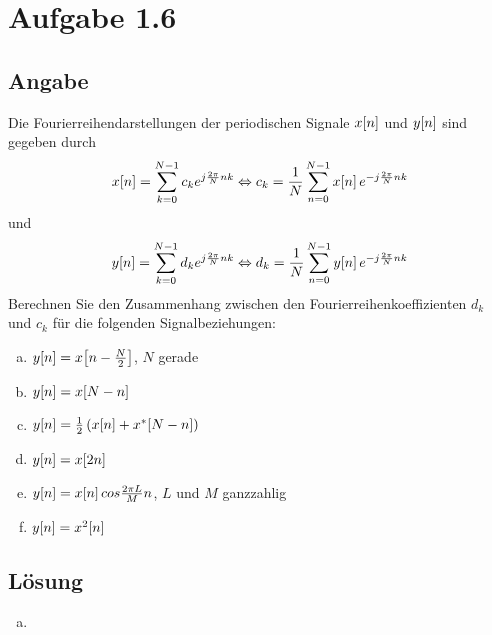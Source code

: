 \section*{Aufgabe 1.6}
\subsection*{Angabe}
Die Fourierreihendarstellungen der periodischen Signale $x\negthinspace\left[n\right]$ und $y\negthinspace\left[n\right]$ sind gegeben durch
\[
	x\negthinspace\left[n\right]=\sum_{k=0}^{N-1}c_ke^{j\frac{2\pi}{N}nk}\Leftrightarrow c_k=\frac{1}{N}\sum_{n=0}^{N-1}x\negthinspace\left[n\right]e^{-j\frac{2\pi}{N}nk}
\]
und
\[
	y\negthinspace\left[n\right]=\sum_{k=0}^{N-1}d_ke^{j\frac{2\pi}{N}nk}\Leftrightarrow d_k=\frac{1}{N}\sum_{n=0}^{N-1}y\negthinspace\left[n\right]e^{-j\frac{2\pi}{N}nk}
\]
Berechnen Sie den Zusammenhang zwischen den Fourierreihenkoeffizienten $d_k$ und $c_k$ für die folgenden Signalbeziehungen:
\begin{enumerate}[a)]
	\item $y\negthinspace\left[n\right]=x\negthinspace\left[n-\frac{N}{2}\right]$,	$N$ gerade
	\item $y\negthinspace\left[n\right]=x\negthinspace\left[N-n\right]$
	\item $y\negthinspace\left[n\right]=\frac{1}{2}\left(x\negthinspace\left[n\right]+x^*\negthinspace\left[N-n\right]\right)$
	\item $y\negthinspace\left[n\right]=x\negthinspace\left[2n\right]$
	\item $y\negthinspace\left[n\right]=x\negthinspace\left[n\right]cos \frac{2\pi L}{M}n$,	$L$ und $M$ ganzzahlig
	\item $y\negthinspace\left[n\right]=x^2\negthinspace\left[n\right]$
\end{enumerate}
\subsection*{Lösung}
\begin{enumerate}[a)]
	\item 
\end{enumerate}